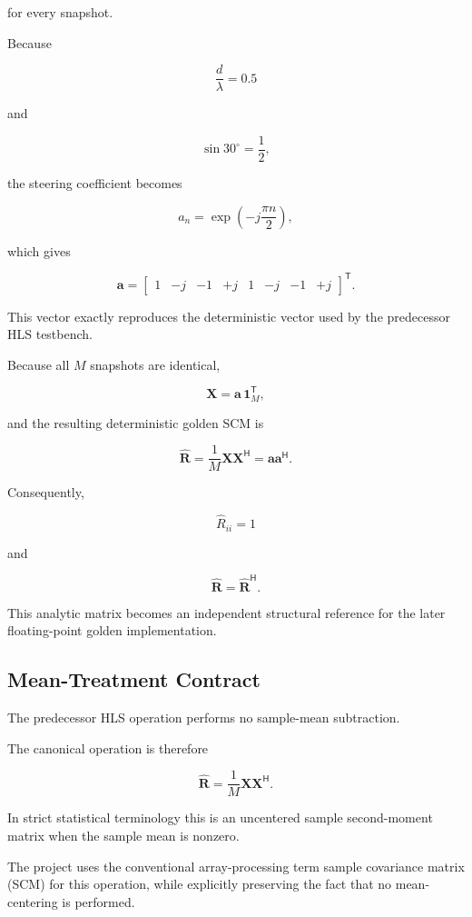 for every snapshot.

Because

\[
\frac{d}{\lambda}=0.5
\]

and

\[
\sin 30^\circ=\frac{1}{2},
\]

the steering coefficient becomes

\[
a_n
=
\exp\!\left(-j\frac{\pi n}{2}\right),
\]

which gives

\[
\mathbf a
=
\begin{bmatrix}
1 &
-j &
-1 &
+j &
1 &
-j &
-1 &
+j
\end{bmatrix}^{\mathsf T}.
\]

This vector exactly reproduces the deterministic vector used by the
predecessor HLS testbench.

Because all \(M\) snapshots are identical,

\[
\mathbf X
=
\mathbf a\,\mathbf 1_M^{\mathsf T},
\]

and the resulting deterministic golden SCM is

\[
\widehat{\mathbf R}
=
\frac{1}{M}
\mathbf X\mathbf X^{\mathsf H}
=
\mathbf a\mathbf a^{\mathsf H}.
\]

Consequently,

\[
\widehat R_{ii}=1
\]

and

\[
\widehat{\mathbf R}
=
\widehat{\mathbf R}^{\mathsf H}.
\]

This analytic matrix becomes an independent structural reference for the
later floating-point golden implementation.

\subsection{Mean-Treatment Contract}

The predecessor HLS operation performs no sample-mean subtraction.

The canonical operation is therefore

\[
\widehat{\mathbf R}
=
\frac{1}{M}
\mathbf X\mathbf X^{\mathsf H}.
\]

In strict statistical terminology this is an uncentered sample second-moment
matrix when the sample mean is nonzero.

The project uses the conventional array-processing term sample covariance
matrix (SCM) for this operation, while explicitly preserving the fact that no
mean-centering is performed.

